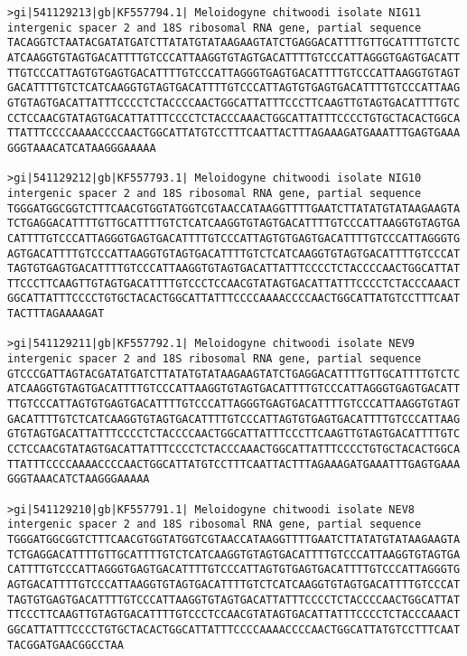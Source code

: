 \documentclass[11pt]{article}
\begin{document}
\begin{Verbatim}[commandchars=\\\{\}]
>gi|541129213|gb|KF557794.1| Meloidogyne chitwoodi isolate NIG11 intergenic spacer 2 and 18S ribosomal RNA gene, partial sequence
TACAGGTCTAATACGATATGATCTTATATGTATAAGAAGTATCTGAGGACATTTTGTTGCATTTTGTCTC
ATCAAGGTGTAGTGACATTTTGTCCCATTAAGGTGTAGTGACATTTTGTCCCATTAGGGTGAGTGACATT
TTGTCCCATTAGTGTGAGTGACATTTTGTCCCATTAGGGTGAGTGACATTTTGTCCCATTAAGGTGTAGT
GACATTTTGTCTCATCAAGGTGTAGTGACATTTTGTCCCATTAGTGTGAGTGACATTTTGTCCCATTAAG
GTGTAGTGACATTATTTCCCCTCTACCCCAACTGGCATTATTTCCCTTCAAGTTGTAGTGACATTTTGTC
CCTCCAACGTATAGTGACATTATTTCCCCTCTACCCAAACTGGCATTATTTCCCCTGTGCTACACTGGCA
TTATTTCCCCAAAACCCCAACTGGCATTATGTCCTTTCAATTACTTTAGAAAGATGAAATTTGAGTGAAA
GGGTAAACATCATAAGGGAAAAA

>gi|541129212|gb|KF557793.1| Meloidogyne chitwoodi isolate NIG10 intergenic spacer 2 and 18S ribosomal RNA gene, partial sequence
TGGGATGGCGGTCTTTCAACGTGGTATGGTCGTAACCATAAGGTTTTGAATCTTATATGTATAAGAAGTA
TCTGAGGACATTTTGTTGCATTTTGTCTCATCAAGGTGTAGTGACATTTTGTCCCATTAAGGTGTAGTGA
CATTTTGTCCCATTAGGGTGAGTGACATTTTGTCCCATTAGTGTGAGTGACATTTTGTCCCATTAGGGTG
AGTGACATTTTGTCCCATTAAGGTGTAGTGACATTTTGTCTCATCAAGGTGTAGTGACATTTTGTCCCAT
TAGTGTGAGTGACATTTTGTCCCATTAAGGTGTAGTGACATTATTTCCCCTCTACCCCAACTGGCATTAT
TTCCCTTCAAGTTGTAGTGACATTTTGTCCCTCCAACGTATAGTGACATTATTTCCCCTCTACCCAAACT
GGCATTATTTCCCCTGTGCTACACTGGCATTATTTCCCCAAAACCCCAACTGGCATTATGTCCTTTCAAT
TACTTTAGAAAAGAT

>gi|541129211|gb|KF557792.1| Meloidogyne chitwoodi isolate NEV9 intergenic spacer 2 and 18S ribosomal RNA gene, partial sequence
GTCCCGATTAGTACGATATGATCTTATATGTATAAGAAGTATCTGAGGACATTTTGTTGCATTTTGTCTC
ATCAAGGTGTAGTGACATTTTGTCCCATTAAGGTGTAGTGACATTTTGTCCCATTAGGGTGAGTGACATT
TTGTCCCATTAGTGTGAGTGACATTTTGTCCCATTAGGGTGAGTGACATTTTGTCCCATTAAGGTGTAGT
GACATTTTGTCTCATCAAGGTGTAGTGACATTTTGTCCCATTAGTGTGAGTGACATTTTGTCCCATTAAG
GTGTAGTGACATTATTTCCCCTCTACCCCAACTGGCATTATTTCCCTTCAAGTTGTAGTGACATTTTGTC
CCTCCAACGTATAGTGACATTATTTCCCCTCTACCCAAACTGGCATTATTTCCCCTGTGCTACACTGGCA
TTATTTCCCCAAAACCCCAACTGGCATTATGTCCTTTCAATTACTTTAGAAAGATGAAATTTGAGTGAAA
GGGTAAACATCTAAGGGAAAAA

>gi|541129210|gb|KF557791.1| Meloidogyne chitwoodi isolate NEV8 intergenic spacer 2 and 18S ribosomal RNA gene, partial sequence
TGGGATGGCGGTCTTTCAACGTGGTATGGTCGTAACCATAAGGTTTTGAATCTTATATGTATAAGAAGTA
TCTGAGGACATTTTGTTGCATTTTGTCTCATCAAGGTGTAGTGACATTTTGTCCCATTAAGGTGTAGTGA
CATTTTGTCCCATTAGGGTGAGTGACATTTTGTCCCATTAGTGTGAGTGACATTTTGTCCCATTAGGGTG
AGTGACATTTTGTCCCATTAAGGTGTAGTGACATTTTGTCTCATCAAGGTGTAGTGACATTTTGTCCCAT
TAGTGTGAGTGACATTTTGTCCCATTAAGGTGTAGTGACATTATTTCCCCTCTACCCCAACTGGCATTAT
TTCCCTTCAAGTTGTAGTGACATTTTGTCCCTCCAACGTATAGTGACATTATTTCCCCTCTACCCAAACT
GGCATTATTTCCCCTGTGCTACACTGGCATTATTTCCCCAAAACCCCAACTGGCATTATGTCCTTTCAAT
TACGGATGAACGGCCTAA


\end{Verbatim}
\end{document}
